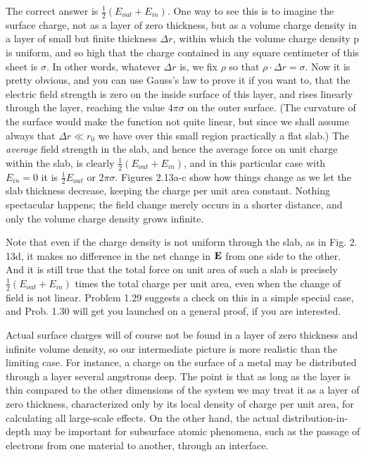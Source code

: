 The correct answer is $\frac{1}{2}(E_{out}+E_{in})$. One way to see this is to
imagine the surface charge, not as a layer of zero thickness, but as a
volume charge density in a layer of small but finite thickness $\Delta r$,
within which the volume charge density p is uniform, and so high that
the charge contained in any square centimeter of this sheet is $\sigma$. In
other words, whatever $\Delta r$ is, we fix $\rho$ so that $\rho\cdot\Delta r=\sigma$. Now it is
pretty obvious, and you can use Gauss's law to prove it if you want to,
that the electric field strength is zero on the inside surface of this
layer, and rises linearly through the layer, reaching the value $4\pi\sigma$ on
the outer surface. (The curvature of the surface would make the
function not quite linear, but since we shall assume always that
$\Delta r\ll r_0$ we have over this small region practically a flat slab.) The
\emph{average} field strength in the slab, and hence the average force on unit
charge within the slab, is clearly $\frac{1}{2}(E_{out}+E_{in})$, and in this particular
case with $E_{in}=0$ it is $\frac{1}{2}E_{out}$ or $2\pi\sigma$. Figures 2.13a-c show how things
change as we let the slab thickness decrease, keeping the charge per
unit area constant. Nothing spectacular happens; the field change
merely occurs in a shorter distance, and only the volume charge
density grows infinite.

Note that even if the charge density is not uniform through the slab,
as in Fig. 2. 13d, it makes no difference in the net change in $\mathbf{E}$ from one
side to the other. And it is still true that the total force on unit area
of such a slab is precisely $\frac{1}{2}(E_{out}+E_{in})$ times the total charge per unit
area, even when the change of field is not linear. Problem 1.29 suggests
a check on this in a simple special case, and Prob. 1.30 will get
you launched on a general proof, if you are interested.

Actual surface charges will of course not be found in a layer of zero
thickness and infinite volume density, so our intermediate picture is
more realistic than the limiting case. For instance, a charge on the
surface of a metal may be distributed through a layer several
angstroms deep. The point is that as long as the layer is thin compared
to the other dimensions of the system we may treat it as a layer
of zero thickness, characterized only by its local density of charge
per unit area, for calculating all large-scale effects. On the other
hand, the actual distribution-in-depth may be important for subsurface
atomic phenomena, such as the passage of electrons from one
material to another, through an interface.


